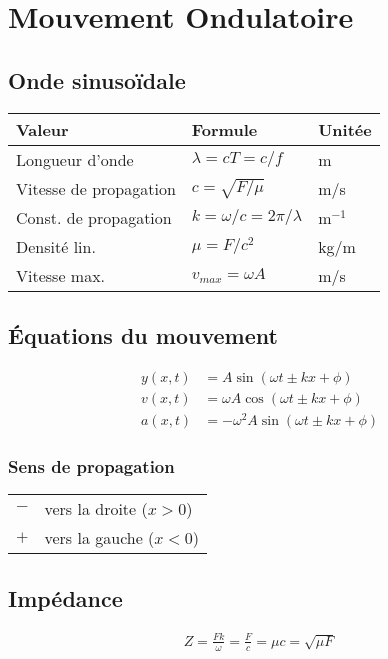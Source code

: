 \section{Mouvement Ondulatoire}
\subsection{Onde sinusoïdale}

\begin{tabular}{lll}
Valeur & Formule & Unitée \\\hline
Longueur d'onde & \(\lambda = cT = c/f\) & m \\%
Vitesse de propagation & \(c=\sqrt{F/\mu} \) & m/s \\%
Const. de propagation & \(k = \omega/c = 2\pi/\lambda\)& m$^{-1}$\\
Densité lin. & \(\mu = F/c^2\) & kg/m\\
Vitesse max. & \( v_{\textit{max}}=\omega A\) & m/s\\%
\end{tabular}%


\subsection{Équations du mouvement}
\begin{align*}
    y(x,t) &= A\sin (\omega t \pm kx+\phi)\\
    v(x,t) &=\omega A\cos (\omega t \pm kx+\phi)\\
    a(x,t) &= -\omega^2 A\sin (\omega t \pm kx+\phi)
\end{align*}
\subsubsection{Sens de propagation}
\begin{center}
    \begin{tabular}{cl}
        $-$ & vers la droite ($x>0$)\\
        $+$ & vers la gauche ($x<0$)
    \end{tabular}
\end{center}

\subsection{Impédance}
\begin{gather*}
    Z=\frac{Fk}{\omega} =\frac{F}{c} =\mu c =\sqrt{\mu F}
\end{gather*}

